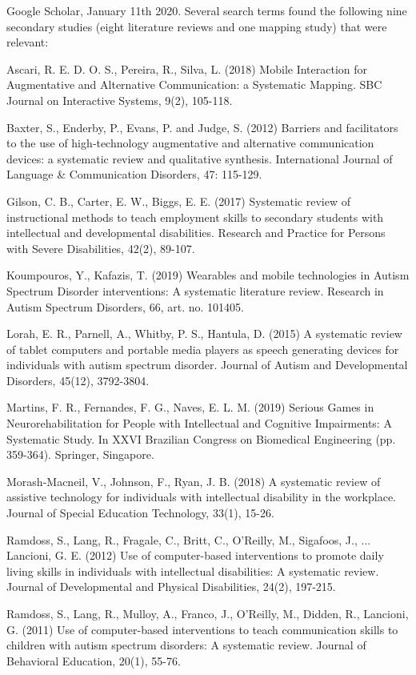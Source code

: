 \documentclass[utf8,english]{gradu3}
\begin{document}
\begin{footnotesize}
  Google Scholar, January 11th 2020. Several search terms found the following nine secondary studies
  (eight literature reviews and one mapping study) that were relevant:
  \begin{compactenum}
    \item Ascari, R. E. D. O. S., Pereira, R., Silva, L. (2018) Mobile Interaction for Augmentative and Alternative Communication: a Systematic Mapping. SBC Journal on Interactive Systems, 9(2), 105-118.
    \item Baxter, S., Enderby, P., Evans, P. and Judge, S. (2012) Barriers and facilitators to the use of high‐technology augmentative and alternative communication devices: a systematic review and qualitative synthesis. International Journal of Language \& Communication Disorders, 47: 115-129.
    \item Gilson, C. B., Carter, E. W., Biggs, E. E. (2017) Systematic review of instructional methods to teach employment skills to secondary students with intellectual and developmental disabilities. Research and Practice for Persons with Severe Disabilities, 42(2), 89-107.
    \item Koumpouros, Y., Kafazis, T. (2019) Wearables and mobile technologies in Autism Spectrum Disorder interventions: A systematic literature review. Research in Autism Spectrum Disorders, 66, art. no. 101405.
    \item Lorah, E. R., Parnell, A., Whitby, P. S., Hantula, D. (2015) A systematic review of tablet computers and portable media players as speech generating devices for individuals with autism spectrum disorder. Journal of Autism and Developmental Disorders, 45(12), 3792-3804.
    \item Martins, F. R., Fernandes, F. G., Naves, E. L. M. (2019) Serious Games in Neurorehabilitation for People with Intellectual and Cognitive Impairments: A Systematic Study. In XXVI Brazilian Congress on Biomedical Engineering (pp. 359-364). Springer, Singapore.
    \item Morash-Macneil, V., Johnson, F., Ryan, J. B. (2018) A systematic review of assistive technology for individuals with intellectual disability in the workplace. Journal of Special Education Technology, 33(1), 15-26.
    \item Ramdoss, S., Lang, R., Fragale, C., Britt, C., O’Reilly, M., Sigafoos, J., ... Lancioni, G. E. (2012) Use of computer-based interventions to promote daily living skills in individuals with intellectual disabilities: A systematic review. Journal of Developmental and Physical Disabilities, 24(2), 197-215.
    \item Ramdoss, S., Lang, R., Mulloy, A., Franco, J., O’Reilly, M., Didden, R., Lancioni, G. (2011) Use of computer-based interventions to teach communication skills to children with autism spectrum disorders: A systematic review. Journal of Behavioral Education, 20(1), 55-76.
  \end{compactenum}
\end{footnotesize}
\end{document}
